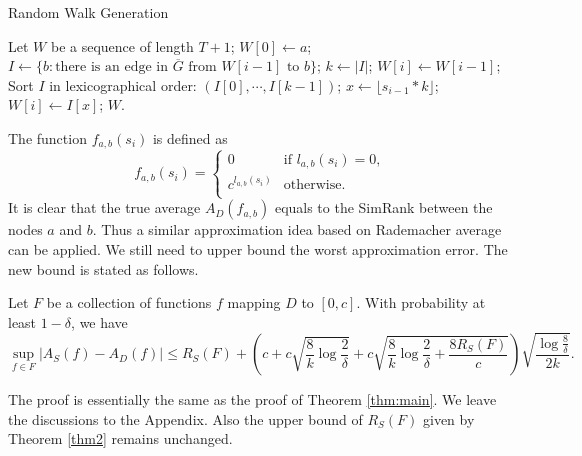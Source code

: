 \documentclass{article}
\begin{document}
\begin{algorithm}[!t]
\caption{\textsf{Random Walk Generation}}
\label{alg:rwg}
\renewcommand{\algorithmicrequire}{\textbf{Input:}}
\renewcommand{\algorithmicensure}{\textbf{Output:}}
\begin{algorithmic}
\State Let $W$ be a sequence of length $T+1$;
\State $W[0] \gets a$;
	\State $I \gets \{b: \textrm{there is an edge in $\overline{G}$ from $W[i-1]$ to $b$}\}$;
	\State $k \gets |I|$;
		\State $W[i] \gets W[i-1]$;
	\Else
		\State Sort $I$ in lexicographical order: $(I[0],\cdots,I[k-1])$;
		\State $x \gets \lfloor s_{i-1} * k \rfloor$;
		\State $W[i] \gets I[x]$;
	\EndIf
\EndFor
{} $W$.
\end{algorithmic}
\end{algorithm}

The function $f_{a,b}(s_i)$ is defined as 
$$f_{a,b}(s_i) =\begin{cases}
0 & \textrm{if $l_{a,b}(s_i)=0$,} \\
c^{l_{a,b}(s_i)} & \textrm{otherwise}.\\
\end{cases}$$
It is clear that the true average $A_D(f_{a,b})$ equals to the SimRank between the nodes $a$ and $b$. Thus a similar approximation idea based on Rademacher average can be applied. We still need to upper bound the worst approximation error. The new bound is stated as follows.

\begin{theorem}
\label{thm:new}
Let $F$ be a collection of functions $f$ mapping $D$ to $[0,c]$. 
With probability at least $1-\delta$, we have
$$\sup_{f\in F}|A_S(f) - A_D(f)| \leq R_S(F) + \left(c+c\sqrt{\frac{8}{k}\log \frac{2}{\delta}} + c\sqrt{\frac{8}{k}\log \frac{2}{\delta} + \frac{8R_S(F)}{c}}\right)\sqrt{\frac{\log \frac{8}{\delta}}{2k}}.$$
\end{theorem}
The proof is essentially the same as the proof of Theorem \ref{thm:main}. We leave the discussions to the Appendix. Also the upper bound of $R_S(F)$ given by Theorem \ref{thm2} remains unchanged.
\end{document}
